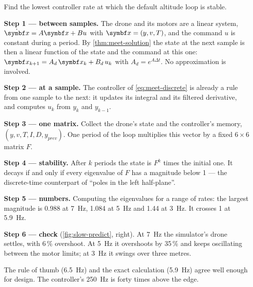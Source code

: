 \begin{example}
\label{ex:slow-discrete}
Find the lowest controller rate at which the default altitude loop is stable.

\textbf{Step 1 — between samples.} The drone and its motors are a linear system, $\dot{\vx} = A\vx + Bu$ with $\vx = (y, v, T)$, and the command $u$ is constant during a period. By \cref{thm:meet-solution} the state at the next sample is then a linear function of the state and the command at this one: $\vx_{k+1} = A_d\,\vx_k + B_d\,u_k$ with $A_d = e^{A\Delta t}$. No approximation is involved.

\textbf{Step 2 — at a sample.} The controller of \cref{eq:meet-discrete} is already a rule from one sample to the next: it updates its integral and its filtered derivative, and computes $u_k$ from $y_k$ and $y_{k-1}$.

\textbf{Step 3 — one matrix.} Collect the drone's state and the controller's memory, $(y, v, T, I, D, y_{prev})$. One period of the loop multiplies this vector by a fixed $6 \times 6$ matrix $F$.

\textbf{Step 4 — stability.} After $k$ periods the state is $F^k$ times the initial one. It decays if and only if every eigenvalue of $F$ has a magnitude below 1 — the discrete-time counterpart of \enquote{poles in the left half-plane}.

\textbf{Step 5 — numbers.} Computing the eigenvalues for a range of rates: the largest magnitude is 0.988 at \SI{7}{Hz}, 1.084 at \SI{5}{Hz} and 1.44 at \SI{3}{Hz}. It crosses 1 at \SI{5.9}{Hz}.

\textbf{Step 6 — check} (\cref{fig:slow-predict}, right). At \SI{7}{Hz} the simulator's drone settles, with 6\,\% overshoot. At \SI{5}{Hz} it overshoots by 35\,\% and keeps oscillating between the motor limits; at \SI{3}{Hz} it swings over three metres.
\end{example}

The rule of thumb (\SI{6.5}{Hz}) and the exact calculation (\SI{5.9}{Hz}) agree well enough for design. The controller's \SI{250}{Hz} is forty times above the edge.



